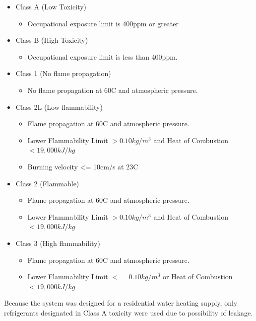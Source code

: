 \begin{itemize}[itemsep=3mm, parsep=-1mm]
\item Class A (Low Toxicity)
    \begin{itemize}
        \item Occupational exposure limit is 400ppm or greater
    \end{itemize}
\item Class B (High Toxicity)
    \begin{itemize}
        \item Occupational exposure limit is less than 400ppm.
    \end{itemize}
\item Class 1 (No flame propagation)
    \begin{itemize}
        \item No flame propagation at 60\textdegree C and atmospheric pressure.
    \end{itemize}
\item Class 2L (Low flammability)
    \begin{itemize}
        \item Flame propagation at 60\textdegree C and atmospheric pressure.
        \item Lower Flammability Limit $> 0.10kg/m^3$ and Heat of Combustion $< 19,000 kJ/kg$
        \item Burning velocity <= 10cm/s at 23\textdegree C
    \end{itemize}
\item Class 2 (Flammable)
    \begin{itemize}
        \item Flame propagation at 60\textdegree C and atmospheric pressure.
        \item Lower Flammability Limit $> 0.10kg/m^3$ and Heat of Combustion $< 19,000 kJ/kg$
    \end{itemize}
\item Class 3 (High flammability)
    \begin{itemize}
        \item Flame propagation at 60\textdegree C and atmospheric pressure.
        \item Lower Flammability Limit $<= 0.10kg/m^3$ or Heat of Combustion $< 19,000 kJ/kg$
    \end{itemize}
\end{itemize}

\medskip
Because the system was designed for a residential water heating supply, only refrigerants designated in Class A toxicity were used due to possibility of leakage.

